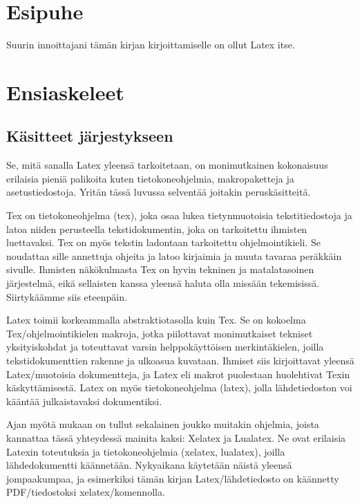 \documentclass[a4paper,10pt,notitlepage,oneside]{book}
\newcommand{\koodi}[1]{\textsf{#1}}
\begin{document}
\pagestyle{fancy}


\chapter*{Esipuhe}

Suurin innoittajani tämän kirjan kirjoittamiselle on ollut Latex itse.

\chapter{Ensiaskeleet}
\section{Käsitteet järjestykseen}

Se, mitä sanalla Latex yleensä tarkoitetaan, on monimutkainen
kokonaisuus erilaisia pieniä palikoita kuten tietokone\-ohjelmia,
makropaketteja ja asetustiedostoja. Yritän tässä luvussa selventää
joitakin peruskäsitteitä.

Tex on tietokone\-ohjelma (\koodi{tex}), joka osaa lukea tietynmuotoisia
tekstitiedostoja ja latoa niiden perusteella tekstidokumentin, joka on
tarkoitettu ihmisten luettavaksi. Tex on myös tekstin ladontaan
tarkoitettu ohjelmointikieli. Se noudattaa sille annettuja ohjeita ja
latoo kirjaimia ja muuta tavaraa peräkkäin sivulle. Ihmisten
näkökulmasta Tex on hyvin tekninen ja matalatasoinen järjestelmä, eikä
sellaisten kanssa yleensä haluta olla missään tekemisissä. Siirtykäämme
siis eteenpäin.

Latex toimii korkeammalla abstraktiotasolla kuin Tex. Se on kokoelma
Tex\-/ohjelmointikielen makroja, jotka piilottavat monimutkaiset
tekniset yksityiskohdat ja toteuttavat varsin helppokäyttöisen
merkintäkielen, joilla tekstidokumenttien rakenne ja ulko\-asua
kuvataan. Ihmiset siis kirjoittavat yleensä Latex\-/muotoisia
dokumentteja, ja Latex eli makrot puolestaan huolehtivat Texin
käskyttämisestä. Latex on myös tietokone\-ohjelma (\koodi{latex}), jolla
lähdetiedoston voi kääntää julkaistavaksi dokumentiksi.

Ajan myötä mukaan on tullut sekalainen joukko muitakin ohjelmia, joista
kannattaa tässä yhteydessä mainita kaksi: Xelatex ja Lualatex. Ne ovat
erilaisia Latexin toteutuksia ja tietokone\-ohjelmia (\koodi{xelatex,
  lualatex}), joilla lähdedokumentti käännetään. Nyky\-aikana käytetään
näistä yleensä jompaakumpaa, ja esimerkiksi tämän kirjan
Latex\-/lähdetiedosto on käännetty PDF\-/tiedostoksi
\koodi{xelatex}\-/komennolla.
\end{document}
